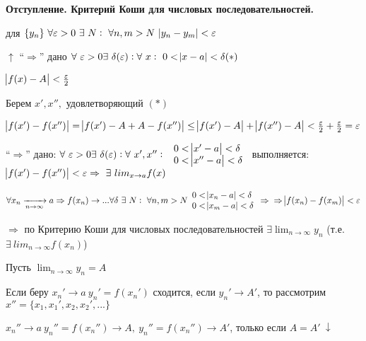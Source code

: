 \documentclass{article}
\begin{document}
\begin{enumerate}
      \textbf{Отступление. Критерий Коши для числовых последовательностей.}
      
      для \(\{y_n\}\ \forall \varepsilon > 0\ \exists\ N:\ \forall n, m > N\ \abs{y_n - y_m} < \varepsilon\)
  
      \( \uparrow \) ``\(\Rightarrow\)'' дано \( \forall\ \varepsilon > 0 \exists\ \delta(\varepsilon): \forall\ x:\ 0 < \abs{x - a} < \delta (*)\)

      \( \abs{f(x) - A} < \frac{\varepsilon}{2} \)
      
      Берем \( x',x'',\) удовлетворяющий $(*)$

      \( \abs{f(x') - f(x'')} = \abs{f(x') - A + A - f(x'')} \leq \abs{f(x') - A} + \abs{f(x'') - A} < \frac{\varepsilon}{2} + \frac{\varepsilon}{2} = \varepsilon \)

      ``\(\Rightarrow\)'' дано: \(\forall\ \varepsilon > 0 \exists\ \delta(\varepsilon): \forall\ x',x'':\ \begin{array}{l}0 < \abs{x' - a} < \delta\\ 0 < \abs{x'' - a} < \delta\end{array}\) выполняется:\\
      \(\abs{f(x')-f(x'')} < \varepsilon \Rightarrow\ \exists\ lim_{x \rightarrow a} f(x)\)

      \(\forall x_n \xrightarrow[n \rightarrow \infty]{} a \Rightarrow f(x_n) \rightarrow ... \forall \delta\ \exists\ N:\ \forall n,m > N \begin{array}{l}0 < \abs{x_n - a} < \delta\\ 0 < \abs{x_m - a} < \delta \end{array} \Rightarrow\\
      \Rightarrow \abs{f(x_n)-f(x_m)}< \varepsilon\)
      
      \(\Rightarrow\) по Критерию Коши для числовых последовательностей \(\exists \lim_{n \rightarrow \infty} y_n\) (т.е. \(\exists\ lim_{n \rightarrow \infty} f(x_n)\))
            
      Пусть \( \lim_{n \rightarrow \infty} y_n = A \)

      Если беру \( x_n' \rightarrow a\ y_n' = f(x_n')\) сходится, если \( y_n' \rightarrow A' \), то рассмотрим \(x'' = \{x_1, x_1', x_2, x_2', ...\} \)

      \( x_n'' \rightarrow a\ y_n'' = f(x_n'') \rightarrow A,\ y_n'' = f(x_n'') \rightarrow A'\), только если \( A = A'\ \downarrow \)

  \end{enumerate}
\end{document}
